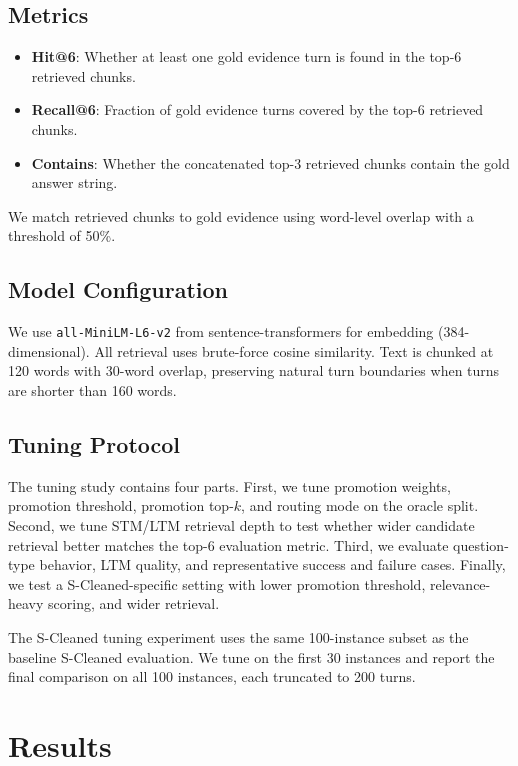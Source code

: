 \documentclass{article}
\begin{document}
\subsection{Metrics}

\begin{itemize}
    \item \textbf{Hit@6}: Whether at least one gold evidence turn is found in the top-6 retrieved chunks.
    \item \textbf{Recall@6}: Fraction of gold evidence turns covered by the top-6 retrieved chunks.
    \item \textbf{Contains}: Whether the concatenated top-3 retrieved chunks contain the gold answer string.
\end{itemize}

We match retrieved chunks to gold evidence using word-level overlap with a threshold of 50\%.

\subsection{Model Configuration}

We use \texttt{all-MiniLM-L6-v2} from sentence-transformers for embedding (384-dimensional). All retrieval uses brute-force cosine similarity. Text is chunked at 120 words with 30-word overlap, preserving natural turn boundaries when turns are shorter than 160 words.

\subsection{Tuning Protocol}

The tuning study contains four parts. First, we tune promotion weights, promotion threshold, promotion top-$k$, and routing mode on the oracle split. Second, we tune STM/LTM retrieval depth to test whether wider candidate retrieval better matches the top-6 evaluation metric. Third, we evaluate question-type behavior, LTM quality, and representative success and failure cases. Finally, we test a S-Cleaned-specific setting with lower promotion threshold, relevance-heavy scoring, and wider retrieval.

The S-Cleaned tuning experiment uses the same 100-instance subset as the baseline S-Cleaned evaluation. We tune on the first 30 instances and report the final comparison on all 100 instances, each truncated to 200 turns.

\section{Results}
\end{document}
